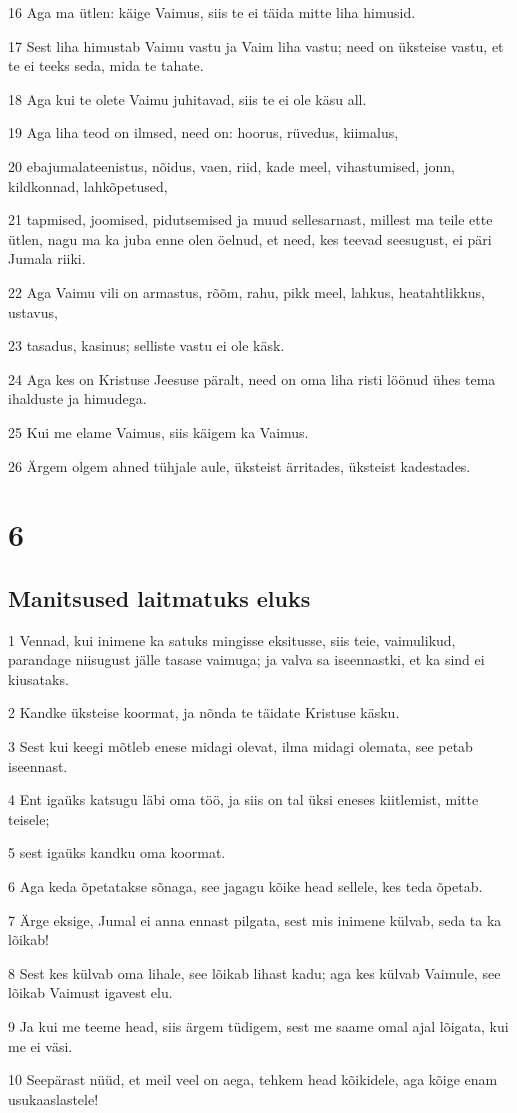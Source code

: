 \par 16 Aga ma ütlen: käige Vaimus, siis te ei täida mitte liha himusid.
\par 17 Sest liha himustab Vaimu vastu ja Vaim liha vastu; need on üksteise vastu, et te ei teeks seda, mida te tahate.
\par 18 Aga kui te olete Vaimu juhitavad, siis te ei ole käsu all.
\par 19 Aga liha teod on ilmsed, need on: hoorus, rüvedus, kiimalus,
\par 20 ebajumalateenistus, nõidus, vaen, riid, kade meel, vihastumised, jonn, kildkonnad, lahkõpetused,
\par 21 tapmised, joomised, pidutsemised ja muud sellesarnast, millest ma teile ette ütlen, nagu ma ka juba enne olen öelnud, et need, kes teevad seesugust, ei päri Jumala riiki.
\par 22 Aga Vaimu vili on armastus, rõõm, rahu, pikk meel, lahkus, heatahtlikkus, ustavus,
\par 23 tasadus, kasinus; selliste vastu ei ole käsk.
\par 24 Aga kes on Kristuse Jeesuse päralt, need on oma liha risti löönud ühes tema ihalduste ja himudega.
\par 25 Kui me elame Vaimus, siis käigem ka Vaimus.
\par 26 Ärgem olgem ahned tühjale aule, üksteist ärritades, üksteist kadestades.


\chapter{6}

\section*{Manitsused laitmatuks eluks}

\par 1 Vennad, kui inimene ka satuks mingisse eksitusse, siis teie, vaimulikud, parandage niisugust jälle tasase vaimuga; ja valva sa iseennastki, et ka sind ei kiusataks.
\par 2 Kandke üksteise koormat, ja nõnda te täidate Kristuse käsku.
\par 3 Sest kui keegi mõtleb enese midagi olevat, ilma midagi olemata, see petab iseennast.
\par 4 Ent igaüks katsugu läbi oma töö, ja siis on tal üksi eneses kiitlemist, mitte teisele;
\par 5 sest igaüks kandku oma koormat.
\par 6 Aga keda õpetatakse sõnaga, see jagagu kõike head sellele, kes teda õpetab.
\par 7 Ärge eksige, Jumal ei anna ennast pilgata, sest mis inimene külvab, seda ta ka lõikab!
\par 8 Sest kes külvab oma lihale, see lõikab lihast kadu; aga kes külvab Vaimule, see lõikab Vaimust igavest elu.
\par 9 Ja kui me teeme head, siis ärgem tüdigem, sest me saame omal ajal lõigata, kui me ei väsi.
\par 10 Seepärast nüüd, et meil veel on aega, tehkem head kõikidele, aga kõige enam usukaaslastele!

